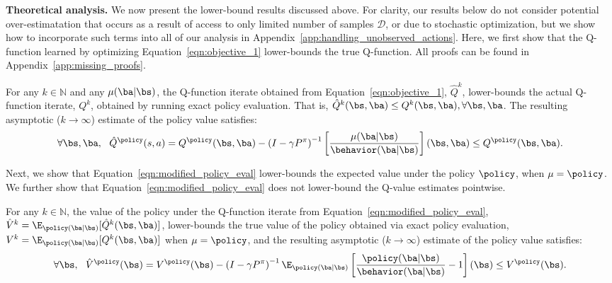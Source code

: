 \textbf{Theoretical analysis.} We now present the lower-bound results discussed above. For clarity, our results below do not consider potential over-estimatation that occurs as a result of access to only limited number of samples $\mathcal{D}$, or due to stochastic optimization, but we show how to incorporate such terms into all of our analysis in Appendix~\ref{app:handling_unobserved_actions}. Here, we first show that the Q-function learned by optimizing Equation~\ref{eqn:objective_1} lower-bounds the true Q-function. All proofs can be found in Appendix~\ref{app:missing_proofs}.
\begin{proposition}
\label{thm:min_q_underestimates}
For any $k \in \mathbb{N}$ and any $\mu(\ba|\bs)$, the Q-function iterate obtained from Equation~\ref{eqn:objective_1}, $\hat{Q}^k$, lower-bounds the actual Q-function iterate, $Q^k$, obtained by running exact policy evaluation.
That is, $\hat{Q}^k(\bs, \ba) \leq Q^k(\bs, \ba), \forall \bs, \ba$. 
The resulting asymptotic ($k \rightarrow \infty$) estimate of the policy value satisfies: 
\begin{equation*}
\forall \bs, \ba, ~~ \hat{Q}^\policy(s, a) = Q^\policy(\bs, \ba) - \left(I - \gamma P^\pi \right)^{-1} \left[\frac{\mu(\ba|\bs)}{\behavior(\ba|\bs)} \right](\bs, \ba) \leq Q^\policy(\bs, \ba).    
\end{equation*}
\end{proposition}

Next, we show that Equation~\ref{eqn:modified_policy_eval} lower-bounds the expected value under the policy $\policy$, when $\mu = \policy$. We further show that Equation~\ref{eqn:modified_policy_eval} does not lower-bound the Q-value estimates pointwise.
\begin{theorem}
\label{thm:cql_underestimates}
For any $k \in \mathbb{N}$, the value of the policy under the Q-function iterate from Equation~\ref{eqn:modified_policy_eval}, $\hat{V}^k = \E_{\policy(\ba|\bs)}[\hat{Q}^k(\bs, \ba)]$, lower-bounds the true value of the policy obtained via exact policy evaluation, $V^k = \E_{\policy(\ba|\bs)}[Q^k(\bs, \ba)]$ when $\mu = \policy$, 
and the resulting asymptotic ($k \rightarrow \infty$) estimate of the policy value satisfies: 
\begin{equation*}
\forall \bs, ~~ \hat{V}^\policy(\bs) = V^\policy(\bs) - \left(I - \gamma P^\pi \right)^{-1} \E_{\policy(\ba|\bs)}\left[\frac{\policy(\ba|\bs)}{\behavior(\ba|\bs)} - 1 \right](\bs) \leq V^\policy(\bs).    
\end{equation*}
\end{theorem}


